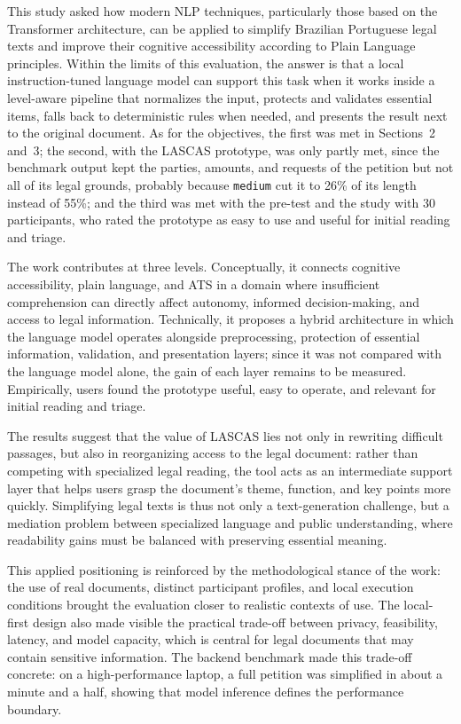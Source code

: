 \documentclass[english]{UNISINOSartigo} %
\begin{document}
This study asked how modern NLP techniques, particularly those based on the Transformer architecture, can be applied to simplify Brazilian Portuguese legal texts and improve their cognitive accessibility according to Plain Language principles. Within the limits of this evaluation, the answer is that a local instruction-tuned language model can support this task when it works inside a level-aware pipeline that normalizes the input, protects and validates essential items, falls back to deterministic rules when needed, and presents the result next to the original document. As for the objectives, the first was met in Sections~2 and~3; the second, with the LASCAS prototype, was only partly met, since the benchmark output kept the parties, amounts, and requests of the petition but not all of its legal grounds, probably because \texttt{medium} cut it to 26\% of its length instead of 55\%; and the third was met with the pre-test and the study with 30 participants, who rated the prototype as easy to use and useful for initial reading and triage.

The work contributes at three levels. Conceptually, it connects cognitive accessibility, plain language, and ATS in a domain where insufficient comprehension can directly affect autonomy, informed decision-making, and access to legal information. Technically, it proposes a hybrid architecture in which the language model operates alongside preprocessing, protection of essential information, validation, and presentation layers; since it was not compared with the language model alone, the gain of each layer remains to be measured. Empirically, users found the prototype useful, easy to operate, and relevant for initial reading and triage.

The results suggest that the value of LASCAS lies not only in rewriting difficult passages, but also in reorganizing access to the legal document: rather than competing with specialized legal reading, the tool acts as an intermediate support layer that helps users grasp the document's theme, function, and key points more quickly. Simplifying legal texts is thus not only a text-generation challenge, but a mediation problem between specialized language and public understanding, where readability gains must be balanced with preserving essential meaning.

This applied positioning is reinforced by the methodological stance of the work: the use of real documents, distinct participant profiles, and local execution conditions brought the evaluation closer to realistic contexts of use. The local-first design also made visible the practical trade-off between privacy, feasibility, latency, and model capacity, which is central for legal documents that may contain sensitive information. The backend benchmark made this trade-off concrete: on a high-performance laptop, a full petition was simplified in about a minute and a half, showing that model inference defines the performance boundary.
\end{document}
